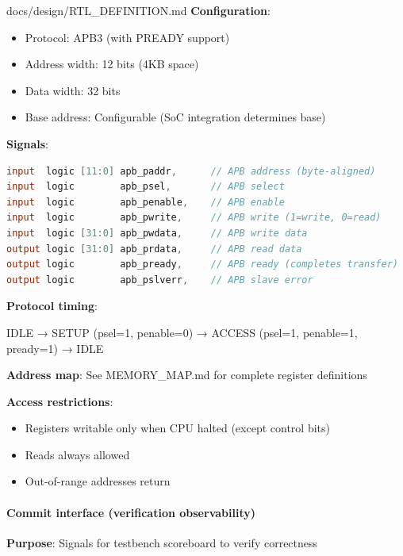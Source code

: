 \begin{relocated}{docs/design/RTL_DEFINITION.md}
\textbf{Configuration}:

\begin{itemize}
\tightlist
\item
  Protocol: APB3 (with PREADY support)
\item
  Address width: 12 bits (4KB space)
\item
  Data width: 32 bits
\item
  Base address: Configurable (SoC integration determines base)
\end{itemize}

\textbf{Signals}:

\begin{lstlisting}[language=Verilog]
input  logic [11:0] apb_paddr,      // APB address (byte-aligned)
input  logic        apb_psel,       // APB select
input  logic        apb_penable,    // APB enable
input  logic        apb_pwrite,     // APB write (1=write, 0=read)
input  logic [31:0] apb_pwdata,     // APB write data
output logic [31:0] apb_prdata,     // APB read data
output logic        apb_pready,     // APB ready (completes transfer)
output logic        apb_pslverr,    // APB slave error
\end{lstlisting}

\textbf{Protocol timing}:

\begin{textblock}
IDLE → SETUP (psel=1, penable=0) → ACCESS (psel=1, penable=1, pready=1) → IDLE
\end{textblock}

\textbf{Address map}: See MEMORY\_\allowbreak{}MAP.md for complete
register definitions

\textbf{Access restrictions}:

\begin{itemize}
\tightlist
\item
  Registers writable only when CPU halted (except control bits)
\item
  Reads always allowed
\item
  Out-of-range addresses return 
\end{itemize}

\paragraph{Commit interface (verification observability)}\label{ds:ch:rtl-definition:commit-interface-verification-observability}

\textbf{Purpose}: Signals for testbench scoreboard to verify correctness


\end{relocated}
